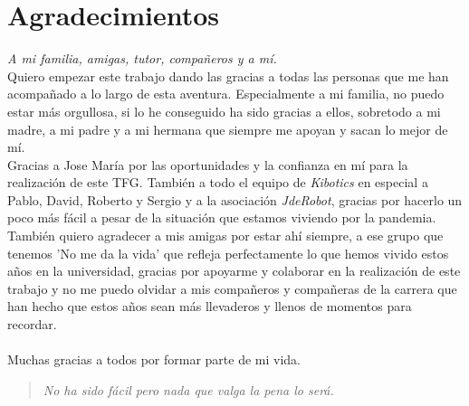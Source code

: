 \newpage
\mbox{}
\thispagestyle{plain}			%
\section*{Agradecimientos}

\textit{A mi familia, amigas, tutor, compañeros y a mí.}\\

Quiero empezar este trabajo dando las gracias a todas las personas que me han acompañado a lo largo de esta aventura. Especialmente a mi familia, no puedo estar más orgullosa, si lo he conseguido ha sido gracias a ellos, sobretodo a mi madre, a mi padre y a mi hermana que siempre me apoyan y sacan lo mejor de mí. \\ 

Gracias a Jose María por las oportunidades y la confianza en mí para la realización de este TFG. También a todo el equipo de \textit{Kibotics} en especial a Pablo, David, Roberto y Sergio y a la asociación \textit{JdeRobot}, gracias por hacerlo un poco más fácil a pesar de la situación que estamos viviendo por la pandemia.\\


También quiero agradecer a mis amigas por estar ahí siempre, a ese grupo que tenemos 'No me da la vida' que refleja perfectamente lo que hemos vivido estos años en la universidad, gracias por apoyarme y colaborar en la realización de este trabajo y no me puedo olvidar a mis compañeros y compañeras de la carrera que han hecho que estos años sean más llevaderos y llenos de momentos para recordar.
\\\\
Muchas gracias a todos por formar parte de mi vida. \\

\begin{quote}
  \raggedleft
  \textit{No ha sido fácil pero nada que valga la pena lo será.}
\end{quote}






